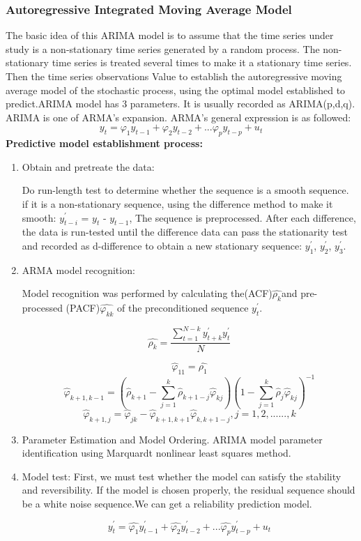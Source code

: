 \documentclass{mcmthesis}
\begin{document}
        \subsubsection{Autoregressive Integrated Moving Average Model}
        The basic idea of this ARIMA model is to assume that the time series under study is a non-stationary time series generated by a random process. The non-stationary time series is treated several times to make it a stationary time series. Then the time series observations Value to establish the autoregressive moving average model of the stochastic process, using the optimal model established to predict.ARIMA model has 3 parameters. It is usually recorded as ARIMA(p,d,q). ARIMA is one of ARMA's expansion.
        ARMA's general expression is as followed:
        $$y_{t}=\varphi_{1}y_{t-1}+\varphi_{2}y_{t-2}+...\varphi_{p}y_{t-p}+u_{t}$$
        \textbf{Predictive model establishment process:}
        \begin{enumerate}
          \item Obtain and pretreate the data:

           Do run-length test to determine whether the sequence is a smooth sequence. if it is a non-stationary sequence, using the difference method to make it smooth: $y_{t-i}^{'}$ = $y_{t}$ - $y_{t-1}$, The sequence is preprocessed. After each difference, the data is run-tested until the difference data can pass the stationarity test and recorded as d-difference to obtain a new stationary sequence: $y_{1}^{'}$, $y_{2}^{'}$, $y_{3}^{'}$.

          \item ARMA model recognition:

          Model recognition was performed by calculating the(ACF)$\hat{\rho_{k}}$and pre-processed (PACF)$\hat{\varphi_{kk}}$ of the preconditioned sequence $y_{t}^{'}$.

          $$\hat{\rho_{k}} = \frac{\sum_{t=1}^{N-k}y_{t+k}^{'}y_{t}^{'}}{N}$$

          $$\hat{\varphi}_{11} = \hat{\rho_{1}}$$
          $$\hat{\varphi}_{k+1,k-1} = (\hat{\rho}_{k+1}-\sum_{j=1}^{k}\hat{\rho}_{k+1-j}\hat{\varphi}_{kj})(1-\sum_{j=1}^{k}\hat{\rho}_{j}\hat{\varphi}_{kj})^{-1}$$
          $$\hat{\varphi}_{k+1,j} = \hat{\varphi}_{jk} - \hat{\varphi}_{k+1,k+1}\hat{\varphi}_{k,k+1-j},j = 1, 2, ......, k $$

          \item Parameter Estimation and Model Ordering. ARIMA model parameter identification using Marquardt nonlinear least squares method.

          \item Model test:
          First, we must test whether the model can satisfy the stability and reversibility. If the model is chosen properly, the residual sequence should be a white noise sequence.We can get a reliability prediction model.

          $$y_{t}^{'}=\hat{\varphi_{1}}y_{t-1}^{'}+\hat{\varphi_{2}}y_{t-2}^{'}+...\hat{\varphi_{p}}y_{t-p}^{'}+u_{t}$$


        \end{enumerate}
\end{document}
